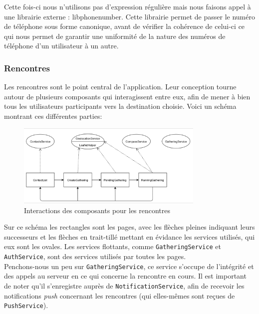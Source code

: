 \documentclass[french]{article}
\begin{document}
	Cette fois-ci nous n'utilisons pas d'expression régulière mais nous faisons appel à une librairie externe : libphonenumber.
	Cette librairie permet de passer le numéro de téléphone sous forme canonique, avant de vérifier la cohérence de celui-ci ce qui nous permet de garantir une uniformité de la nature des numéros de téléphone d'un utilisateur à un autre.
	
	 
	
	\subsubsection{Rencontres}
	
	Les rencontres sont le point central de l'application. Leur conception tourne autour de plusieurs composants qui interagissent entre eux, afin de mener à bien tous les utilisateurs participants vers la destination choisie. Voici un schéma montrant ces différentes parties:
	\begin{figure}[H]
		\centering
		\includegraphics[width=0.8\textwidth]{../schema/gathering-page-flow}
		\caption{Interactions des composants pour les rencontres}
	\end{figure}

	Sur ce schéma les rectangles sont les pages, avec les flèches pleines indiquant leurs successeurs et les flèches en trait-tillé mettant en évidance les services utilisés, qui eux sont les ovales. Les services flottants, comme \texttt{GatheringService} et \texttt{AuthService}, sont des services utilisés par toutes les pages.\\
	
	Penchons-nous un peu sur \texttt{GatheringService}, ce service s'occupe de l'intégrité et des appels au serveur en ce qui concerne la rencontre en cours. Il est important de noter qu'il s'enregistre auprès de \texttt{NotificationService}, afin de recevoir les notifications \textit{push} concernant les rencontres (qui elles-mêmes sont reçues de \texttt{PushService}).\\
	
\end{document}
